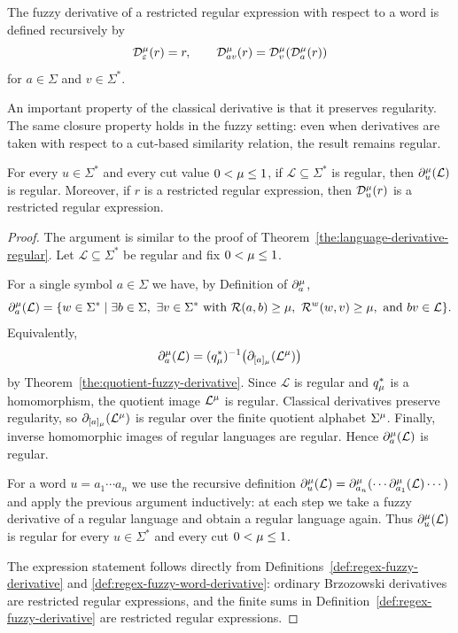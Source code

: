 \begin{definition}\label{def:regex-fuzzy-word-derivative}
The fuzzy derivative of a restricted regular expression with respect to a word is defined
recursively by
\[
  \mathcal D_\varepsilon^\mu(r)=r,
  \qquad
  \mathcal D_{av}^\mu(r)=\mathcal D_v^\mu(\mathcal D_a^\mu(r))
\]
for $a\in\Sigma$ and $v\in\Sigma^*$.
\end{definition}

\noindent
An important property of the classical derivative is that it preserves
regularity. The same closure property holds in the fuzzy setting: even when
derivatives are taken with respect to a cut-based similarity relation, the
result remains regular.

\begin{theorem}\label{the:language-fuzzy-derivative-regular}
For every $u\in\Sigma^*$ and every cut value $0 < \mu \le 1$, if
$\mathcal{L} \subseteq \Sigma^*$ is regular, then
$\partial^\mu_u(\mathcal{L})$ is regular. Moreover, if $r$ is a
restricted regular expression, then $\mathcal D_u^\mu(r)$ is a restricted
regular expression.
\end{theorem}

\begin{proof}
The argument is similar to the proof of Theorem~\ref{the:language-derivative-regular}.
Let $\mathcal{L} \subseteq \Sigma^*$ be regular and fix $0 < \mu \le 1$.

For a single symbol $a \in \Sigma$ we have, by Definition of $\partial_a^\mu$,
\[
  \partial_a^\mu(\mathcal{L})
  =
  \{ w \in \Sigma^* \mid
    \exists b\in\Sigma,\ \exists v\in\Sigma^*
    \text{ with } {\mathcal R}(a,b)\ge\mu,\ \mathcal R^w(w,v)\ge\mu,
    \text{ and } bv\in\mathcal L \}.
\]
Equivalently,
\[
  \partial_a^\mu(\mathcal L)
  =
  (q_\mu^*)^{-1}
  \bigl(\partial_{[a]_\mu}(\mathcal L^\mu)\bigr)
\]
by Theorem~\ref{the:quotient-fuzzy-derivative}. Since $\mathcal L$ is regular
and $q_\mu^*$ is a homomorphism, the quotient image $\mathcal L^\mu$ is
regular. Classical derivatives preserve regularity, so
$\partial_{[a]_\mu}(\mathcal L^\mu)$ is regular over the finite quotient
alphabet $\Sigma^\mu$. Finally, inverse homomorphic images of regular languages
are regular. Hence $\partial_a^\mu(\mathcal L)$ is regular.

For a word $u = a_1 \cdots a_n$ we use the recursive definition
$\partial_u^\mu(\mathcal{L}) = \partial_{a_n}^\mu(\cdots \partial_{a_1}^\mu(\mathcal{L}) \cdots)$
and apply the previous argument inductively: at each step we take a fuzzy
derivative of a regular language and obtain a regular language again. Thus
$\partial_u^\mu(\mathcal{L})$ is regular for every $u \in \Sigma^*$ and every
cut $0 < \mu \le 1$.

The expression statement follows directly from
Definitions~\ref{def:regex-fuzzy-derivative} and
\ref{def:regex-fuzzy-word-derivative}: ordinary Brzozowski derivatives are
restricted regular expressions, and the finite sums in
Definition~\ref{def:regex-fuzzy-derivative} are restricted regular expressions.
\end{proof}

